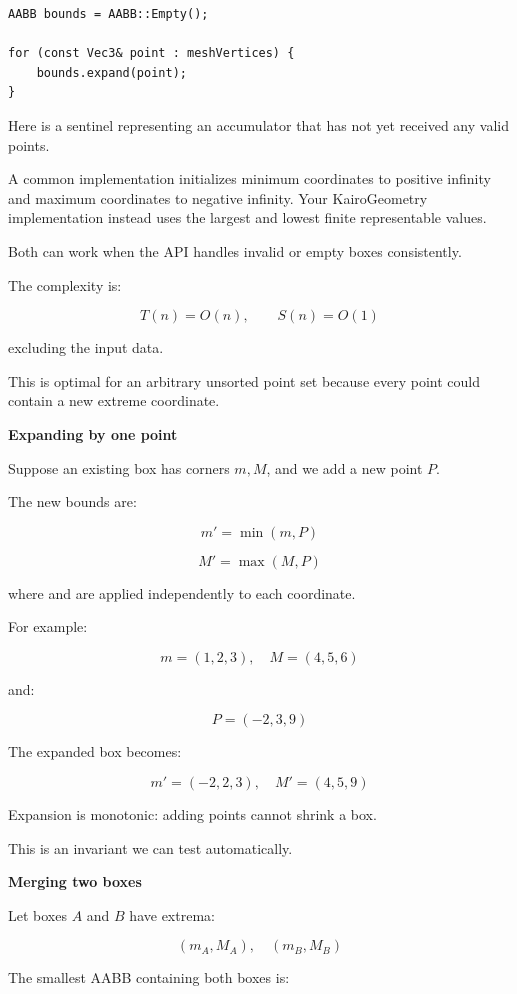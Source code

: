 \begin{verbatim}
AABB bounds = AABB::Empty();

for (const Vec3& point : meshVertices) {
    bounds.expand(point);
}
\end{verbatim}

Here  is a sentinel representing an accumulator that has not yet received any valid points.

A common implementation initializes minimum coordinates to positive infinity and maximum coordinates to negative infinity. Your KairoGeometry implementation instead uses the largest and lowest finite representable values.

Both can work when the API handles invalid or empty boxes consistently.

The complexity is:

\[
T(n)=O(n),\qquad S(n)=O(1)
\]

excluding the input data.

This is optimal for an arbitrary unsorted point set because every point could contain a new extreme coordinate.

\textbf{Expanding by one point}

Suppose an existing box has corners \(m,M\), and we add a new point \(P\).

The new bounds are:

\[
m'=\min(m,P)
\]

\[
M'=\max(M,P)
\]

where  and  are applied independently to each coordinate.

For example:

\[
m=(1,2,3),\quad M=(4,5,6)
\]

and:

\[
P=(-2,3,9)
\]

The expanded box becomes:

\[
m'=(-2,2,3),\quad M'=(4,5,9)
\]

Expansion is monotonic: adding points cannot shrink a box.

This is an invariant we can test automatically.

\textbf{Merging two boxes}

Let boxes \(A\) and \(B\) have extrema:

\[
(m_A,M_A),\quad(m_B,M_B)
\]

The smallest AABB containing both boxes is:

